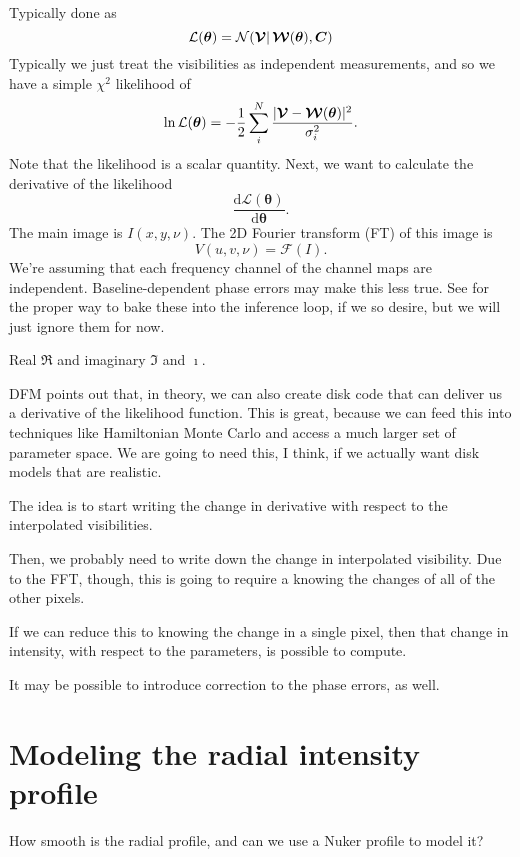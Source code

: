 \documentclass[modern]{aastex62}
\newcommand{\vd}{\boldsymbol{\mathcal{V}}} %
\newcommand{\vm}{\boldsymbol{\mathcal{W}}} %
\newcommand{\btheta}{\boldsymbol{\theta}} %
\begin{document}
Typically done as 
\begin{equation}
    {\cal L}(\boldsymbol{\theta}) = {\cal N}(\boldsymbol{\mathcal{V}} |\, \boldsymbol{\mathcal{W}}(\boldsymbol{\theta}), \boldsymbol{C})
\end{equation}
Typically we just treat the visibilities as independent measurements, and so we have a simple $\chi^2$ likelihood of 
\begin{equation}
    \ln {\cal L}(\btheta) = - \frac{1}{2} \sum_i^N \frac{|\vd - \vm(\btheta)|^2}{\sigma_i^2}.
\end{equation}
Note that the likelihood is a scalar quantity. Next, we want to calculate the derivative of the likelihood
\begin{equation}
    \frac{\mathrm{d}\mathcal{L}(\btheta)}{\mathrm{d}\btheta}.
\end{equation}
The main image is $I(x,y,\nu)$. The 2D Fourier transform (FT) of this image is 
\begin{equation}
    V(u,v,\nu) = \mathcal{F}(I).
\end{equation}
We're assuming that each frequency channel of the channel maps are independent. Baseline-dependent phase errors may make this less true. See \citet{hezaveh13} for the proper way to bake these into the inference loop, if we so desire, but we will just ignore them for now.

Real $\Re$ and imaginary $\Im$ and $\imath$.

DFM points out that, in theory, we can also create disk code that can deliver us a derivative of the likelihood function. This is great, because we can feed this into techniques like Hamiltonian Monte Carlo and access a much larger set of parameter space. We are going to need this, I think, if we actually want disk models that are realistic.

The idea is to start writing the change in derivative with respect to the interpolated visibilities.

Then, we probably need to write down the change in interpolated visibility. Due to the FFT, though, this is going to require a knowing the changes of all of the other pixels. 

If we can reduce this to knowing the change in a single pixel, then that change in intensity, with respect to the parameters, is possible to compute.

It may be possible to introduce correction to the phase errors, as well.

\section{Modeling the radial intensity profile}
How smooth is the radial profile, and can we use a Nuker profile to model it?


\acknowledgments




\end{document}
